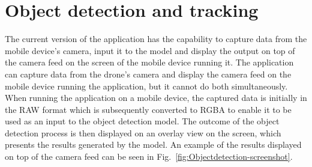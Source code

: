 \section{Object detection and tracking} \label{res:OBJECT}
The current version of the application has the capability to capture data from the mobile device's camera, input it to the model and display the output on top of the camera feed on the screen of the mobile device running it. The application can capture data from the drone's camera and display the camera feed on the mobile device running the application, but it cannot do both simultaneously. When running the application on a mobile device, the captured data is initially in the RAW format which is subsequently converted to RGBA to enable it to be used as an input to the object detection model. The outcome of the object detection process is then displayed on an overlay view  on the screen, which presents the results generated by the model. An example of the results displayed on top of the camera feed can be seen in Fig.~\ref{fig:Objectdetection-screenshot}.
